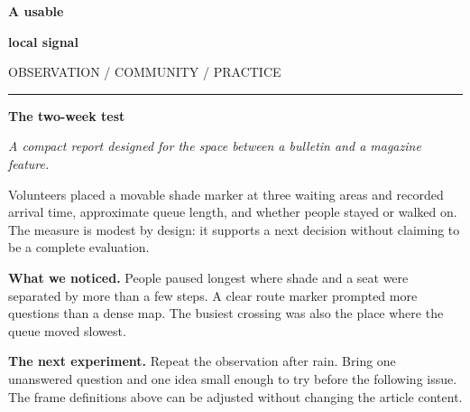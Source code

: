 \documentclass[10pt]{article}
\begin{document}

\color{ink}
{\sffamily\fontsize{30}{32}\selectfont\bfseries A usable\par}
{\sffamily\fontsize{30}{32}\selectfont\bfseries local signal\par}
\medskip
{\sffamily\small\color{accent}OBSERVATION / COMMUNITY / PRACTICE\par}
\medskip
\noindent\rule{\linewidth}{1.5pt}
\medskip
{\sffamily\Large\bfseries The two-week test\par}
\smallskip
\noindent\textit{A compact report designed for the space between a bulletin
and a magazine feature.}

\medskip
Volunteers placed a movable shade marker at three waiting areas and recorded
arrival time, approximate queue length, and whether people stayed or walked on.
The measure is modest by design: it supports a next decision without claiming
to be a complete evaluation.

\medskip
\textbf{What we noticed.}
People paused longest where shade and a seat were separated by more than a few
steps. A clear route marker prompted more questions than a dense map. The
busiest crossing was also the place where the queue moved slowest.

\medskip
\textbf{The next experiment.}
Repeat the observation after rain. Bring one unanswered question and one idea
small enough to try before the following issue. The frame definitions above
can be adjusted without changing the article content.
\end{document}
